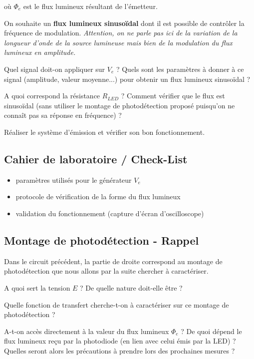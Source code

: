où $\Phi_e$ est le flux lumineux résultant de l'émetteur.

\medskip

On souhaite un \textbf{flux lumineux sinusoïdal} dont il est possible de contrôler la fréquence de modulation. \textit{Attention, on ne parle pas ici de la variation de la longueur d'onde de la source lumineuse mais bien de la modulation du flux lumineux en amplitude.}

\Quest Quel signal doit-on appliquer sur $V_e$ ? Quels sont les paramètres à donner à ce signal (amplitude, valeur moyenne...) pour obtenir un flux lumineux sinusoïdal ?

\Quest A quoi correspond la résistance $R_{LED}$ ? Comment vérifier que le flux est sinusoïdal (sans utiliser le montage de photodétection proposé puisqu'on ne connaît pas sa réponse en fréquence) ?

\Manip Réaliser le système d'émission et vérifier son bon fonctionnement.


\subsection{Cahier de laboratoire / Check-List}

\begin{itemize}[label=$\square$]
	\item paramètres utilisés pour le générateur $V_e$
	\item protocole de vérification de la forme du flux lumineux
	\item validation du fonctionnement (capture d'écran d'oscilloscope)
\end{itemize}


\subsection{Montage de photodétection - Rappel}

Dans le circuit précédent, la partie de droite correspond au montage de photodétection que nous allons par la suite chercher à caractériser.

\Quest A quoi sert la tension $E$ ? De quelle nature doit-elle être ?

\Quest Quelle fonction de transfert cherche-t-on à caractériser sur ce montage de photodétection ? 

\Quest A-t-on accès directement à la valeur du flux lumineux $\Phi_e$ ? De quoi dépend le flux lumineux reçu par la photodiode (en lien avec celui émis par la LED) ? Quelles seront alors les précautions à prendre lors des prochaines mesures ?



